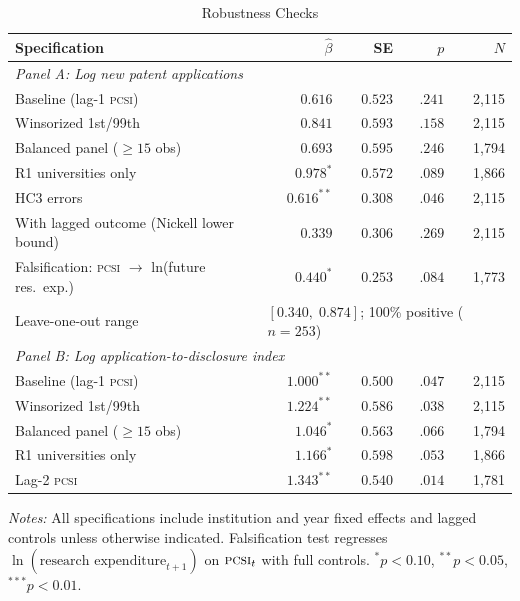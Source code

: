 \documentclass[12pt]{article}
\newcommand{\PCSI}{\textsc{pcsi}}
\begin{document}
\begin{table}[htbp]
\centering
\caption{Robustness Checks}
\label{tab:robust}
\begin{threeparttable}
\begin{tabular}{lrrrr}
\toprule
Specification & $\hat\beta$ & SE & $p$ & $N$ \\
\midrule
\multicolumn{5}{l}{\textit{Panel A: Log new patent applications}} \\[2pt]
Baseline (lag-1 \PCSI{}) & $0.616$ & $0.523$ & $.241$ & 2,115 \\
Winsorized 1st/99th & $0.841$ & $0.593$ & $.158$ & 2,115 \\
Balanced panel ($\geq 15$ obs) & $0.693$ & $0.595$ & $.246$ & 1,794 \\
R1 universities only & $0.978^*$ & $0.572$ & $.089$ & 1,866 \\
HC3 errors & $0.616^{**}$ & $0.308$ & $.046$ & 2,115 \\
With lagged outcome (Nickell lower bound) & $0.339$ & $0.306$ & $.269$ & 2,115 \\
Falsification: \PCSI{} $\to$ ln(future res.\ exp.) & $0.440^*$ & $0.253$ & $.084$ & 1,773 \\
Leave-one-out range & \multicolumn{4}{l}{$[0.340,\;0.874]$; 100\% positive ($n=253$)} \\
\midrule
\multicolumn{5}{l}{\textit{Panel B: Log application-to-disclosure index}} \\[2pt]
Baseline (lag-1 \PCSI{}) & $1.000^{**}$ & $0.500$ & $.047$ & 2,115 \\
Winsorized 1st/99th & $1.224^{**}$ & $0.586$ & $.038$ & 2,115 \\
Balanced panel ($\geq 15$ obs) & $1.046^*$ & $0.563$ & $.066$ & 1,794 \\
R1 universities only & $1.166^*$ & $0.598$ & $.053$ & 1,866 \\
Lag-2 \PCSI{} & $1.343^{**}$ & $0.540$ & $.014$ & 1,781 \\
\bottomrule
\end{tabular}
\begin{tablenotes}
\small
\item \textit{Notes:} All specifications include institution and year fixed effects and
lagged controls unless otherwise indicated. Falsification test regresses $\ln(\text{research
expenditure}_{t+1})$ on $\PCSI{}_t$ with full controls.
$^*p<0.10$, $^{**}p<0.05$, $^{***}p<0.01$.
\end{tablenotes}
\end{threeparttable}
\end{table}
\end{document}
